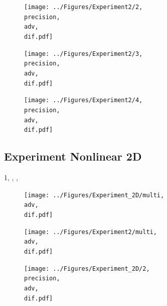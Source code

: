 \documentclass{scrartcl}
\begin{document}
	\begin{figure}[H]
		\centering
		\texttt{[image: ../Figures/Experiment2/2, \\precision, \\adv, \\dif.pdf]}
	\end{figure}
	
	\begin{figure}[H]
		\centering
		\texttt{[image: ../Figures/Experiment2/3, \\precision, \\adv, \\dif.pdf]}
	\end{figure}
	
	\begin{figure}[H]
		\centering
		\texttt{[image: ../Figures/Experiment2/4, \\precision, \\adv, \\dif.pdf]}
	\end{figure}
	
	\subsection{Experiment Nonlinear 2D}
	{1, \precision, \adv, \dif}
	\begin{figure}[H]
		\centering
		\texttt{[image: ../Figures/Experiment\_2D/multi, \\adv, \\dif.pdf]}
	\end{figure}
	\begin{figure}[H]
		\centering
		\texttt{[image: ../Figures/Experiment2/multi, \\adv, \\dif.pdf]}
	\end{figure}
	
	\begin{figure}[H]
		\centering
		\texttt{[image: ../Figures/Experiment\_2D/2, \\precision, \\adv, \\dif.pdf]}
	\end{figure}
	
\end{document}
